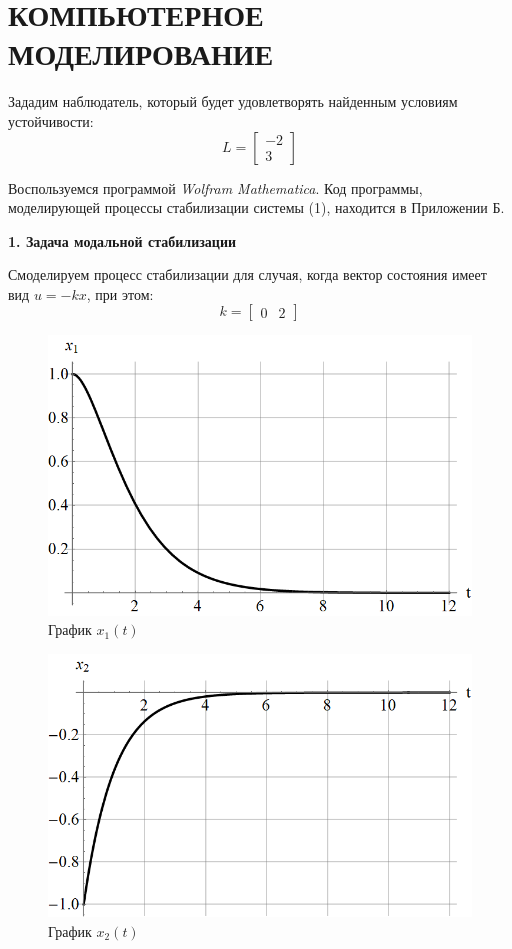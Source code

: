 \chapter{\MakeUppercase{Компьютерное моделирование}}

Зададим наблюдатель, который будет удовлетворять найденным условиям устойчивости:
$$
L=\begin{bmatrix}
    -2 \\ 3
\end{bmatrix}
$$

Воспользуемся программой \textit{Wolfram Mathematica}. Код программы, моделирующей процессы стабилизации системы (1), находится в Приложении Б.

\textbf{1. Задача модальной стабилизации}

Смоделируем процесс стабилизации для случая, когда вектор состояния имеет вид $ u=-kx $, при этом:
$$
k=\begin{bmatrix} 0 & 2 \end{bmatrix}
$$

\begin{figure}[h]
    \centering
    \includegraphics[scale=0.4]{chapter_x6/fig1.png}
    \caption{График $ x_1(t) $}
    \label{1}
\end{figure}


\begin{figure}[h]
    \centering
    \includegraphics[scale=0.4]{chapter_x6/fig2.png}
    \caption{График $ x_2(t) $ }
    \label{1}
\end{figure}

